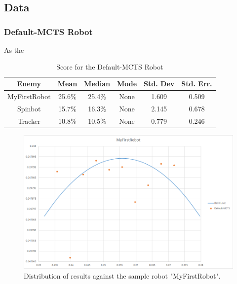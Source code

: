 \subsection{Data}

\subsubsection{Default-MCTS Robot}
As the 

\begin{table}
\begin{center}
\renewcommand{\arraystretch}{1.3}
\caption{Score for the Default-MCTS Robot}
\label{table-default-score}
\begin{tabular}{|c | c | c |c | c| c |}
\hline
Enemy & Mean & Median & Mode & Std. Dev & Std. Err.\\
\hline
MyFirstRobot & 25.6\% & 25.4\% & None & 1.609 & 0.509\\
\hline
Spinbot & 15.7\% & 16.3\% & None & 2.145 & 0.678 \\
\hline
Tracker & 10.8\% & 10.5\% & None & 0.779 & 0.246 \\
\hline
\end{tabular}
\end{center}
\end{table}

\begin{figure}[htp]
\centerline{\includegraphics[width=\columnwidth]{Images/MyFirstRobotDistribution}}
\caption{Distribution of results against the sample robot "MyFirstRobot".}
\label{figure--Distribution-MFR}
\end{figure}


